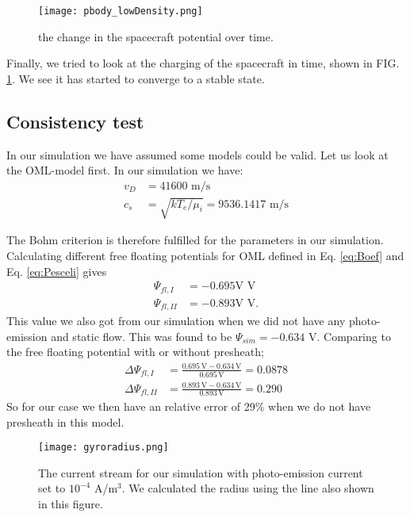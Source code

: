 \documentclass[aip, 
rsi, 
amsmath,
amssymb,
longbibliography,
preprint]{revtex4-1}
\begin{document}
\begin{figure}[!ht]
\texttt{[image: pbody\_lowDensity.png]}
\caption{the change in the spacecraft potential over time.\label{fig:DensityTime}}
\end{figure}

Finally, we tried to look at the charging of the spacecraft in time, shown in FIG. \ref{fig:DensityTime}. We see it has started to converge to a stable state.

\subsection{Consistency test}

In our simulation we have assumed some models could be valid. Let us look at the OML-model first. In our simulation we have:
\begin{align*}
v_D &= 41600 \, \, \text{m/s}\\
c_s &= \sqrt{k T_e / \mu_i} = 9536.1417 \, \, \text{m/s}
\end{align*}

The Bohm criterion is therefore fulfilled for the parameters in our simulation. Calculating different free floating potentials for OML defined in Eq. \ref{eq:Boef} and Eq. \ref{eq:Pesceli} gives
\begin{align*}
\Psi_{fl,I} &= -0.695\text{V} \, \, \text{V}\\
\Psi_{fl,II}&= -0.893 \text{V}\, \, \text{V}.
\end{align*}
This value we also got from our simulation when we did not have any photo-emission and static flow. This was found to be $\Psi_{sim} = -0.634$ V. Comparing to the free floating potential with or without presheath;
\begin{align*}
\Delta \Psi_{fl,I} &= \frac{0.695 \, \text{V} -0.634 \, \text{V}}{0.695 \, \text{V}} = 0.0878\\
\Delta \Psi_{fl,II} &= \frac{0.893 \, \text{V} -0.634 \, \text{V}}{0.893 \, \text{V}} = 0.290
\end{align*}
So for our case we then have an relative error of 29\% when we do not have presheath in this model.\\

\begin{figure}
\texttt{[image: gyroradius.png]}
\caption{The current stream for our simulation with photo-emission current set to $10^{-4}$ A/m$^3$. We calculated the radius using the line also shown in this figure.\label{fig:gyroradius}}
\end{figure}
\end{document}
